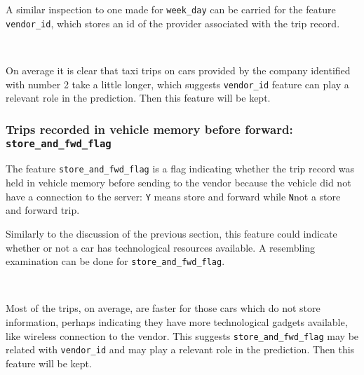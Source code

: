 \documentclass[11pt]{article}
\begin{document}
{A similar inspection to one made for \texttt{week\_day} can be carried
for the feature \texttt{vendor\_id}, which stores an id of the provider
associated with the trip record.

      \begin{center}
    \end{center}
    { \hspace*{\fill} \\}


    
    On average it is clear that taxi trips on cars provided by the company
identified with number 2 take a little longer, which suggests
\texttt{vendor\_id} feature can play a relevant role in the prediction.
Then this feature will be kept.

\subsubsection{\texorpdfstring{Trips recorded in vehicle memory before
forward:
\texttt{store\_and\_fwd\_flag}}{Trips recording in vehicle memory before forward: store\_and\_fwd\_flag}}\label{trips-recording-in-vehicle-memory-before-forward-store_and_fwd_flag}

\hspace{0.5cm} The feature \texttt{store\_and\_fwd\_flag} is a flag indicating whether
the trip record was held in vehicle memory before sending to the vendor
because the vehicle did not have a connection to the server: \texttt{Y}
means store and forward while \texttt{N}not a store and forward trip.

Similarly to the discussion of the previous section, this feature could
indicate whether or not a car has technological resources available. A
resembling examination can be done for \texttt{store\_and\_fwd\_flag}.

      \begin{center}
    \end{center}
    { \hspace*{\fill} \\}

    
    Most of the trips, on average, are faster for those cars which do not
store information, perhaps indicating they have more technological
gadgets available, like wireless connection to the vendor. This suggests
\texttt{store\_and\_fwd\_flag} may be related with \texttt{vendor\_id}
and may play a relevant role in the prediction. Then this feature will
be kept.

}
\end{document}

